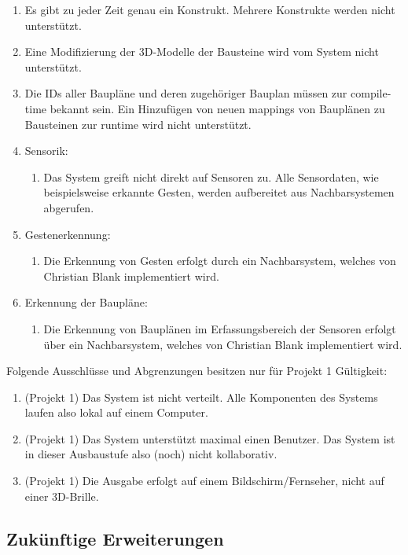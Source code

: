 \begin{enumerate}
	\item Es gibt zu jeder Zeit genau ein Konstrukt. Mehrere Konstrukte werden nicht unterstützt.
	\item Eine Modifizierung der 3D-Modelle der Bausteine wird vom System nicht unterstützt.
	\item Die IDs aller Baupläne und deren zugehöriger Bauplan müssen zur compile-time bekannt sein. Ein Hinzufügen von neuen mappings von Bauplänen zu Bausteinen zur runtime wird nicht unterstützt.
	\item Sensorik:
		\begin{enumerate}
			\item Das System greift nicht direkt auf Sensoren zu. Alle Sensordaten, wie beispielsweise erkannte Gesten, werden aufbereitet aus Nachbarsystemen abgerufen.
		\end{enumerate}		
	\item Gestenerkennung:
		\begin{enumerate}
			\item Die Erkennung von Gesten erfolgt durch ein Nachbarsystem, welches von Christian Blank implementiert wird.
		\end{enumerate}
	\item Erkennung der Baupläne:
		\begin{enumerate}
			\item Die Erkennung von Bauplänen im Erfassungsbereich der Sensoren erfolgt über ein Nachbarsystem, welches von Christian Blank implementiert wird.
		\end{enumerate} 
\end{enumerate}

Folgende Ausschlüsse und Abgrenzungen besitzen nur für Projekt 1 Gültigkeit:

\begin{enumerate}
	\item (Projekt 1) Das System ist nicht verteilt. Alle Komponenten des Systems laufen also lokal auf einem Computer.
	\item (Projekt 1) Das System unterstützt maximal einen Benutzer. Das System ist in dieser Ausbaustufe also (noch) nicht kollaborativ.
	\item (Projekt 1) Die Ausgabe erfolgt auf einem Bildschirm/Fernseher, nicht auf einer 3D-Brille.
\end{enumerate}

\subsection{Zukünftige Erweiterungen}

